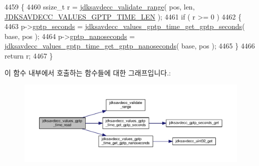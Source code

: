 \begin{DoxyCode}
4459 \{
4460     ssize\_t r = \hyperlink{group__util_ga9c02bdfe76c69163647c3196db7a73a1}{jdksavdecc\_validate\_range}( pos, len, 
      \hyperlink{group__values__gptp__time_ga78c1703ccda95c5b83f9cbcd68bcca08}{JDKSAVDECC\_VALUES\_GPTP\_TIME\_LEN} );
4461     \textcolor{keywordflow}{if} ( r >= 0 )
4462     \{
4463         p->\hyperlink{structjdksavdecc__values__gptp__time_a188b5eb829d9cabad72f2977aa72be85}{gptp\_seconds} = 
      \hyperlink{group__values__gptp__time_ga49bdb84c4dea31f69f583ed725152a22}{jdksavdecc\_values\_gptp\_time\_get\_gptp\_seconds}( base, pos );
4464         p->\hyperlink{structjdksavdecc__values__gptp__time_a5365958d411fe32d294129809036c617}{gptp\_nanoseconds} = 
      \hyperlink{group__values__gptp__time_ga125442481fda8ef931f1e6ae5b787839}{jdksavdecc\_values\_gptp\_time\_get\_gptp\_nanoseconds}( base, pos
       );
4465     \}
4466     \textcolor{keywordflow}{return} r;
4467 \}
\end{DoxyCode}


이 함수 내부에서 호출하는 함수들에 대한 그래프입니다.\+:
\nopagebreak
\begin{figure}[H]
\begin{center}
\leavevmode
\includegraphics[width=350pt]{group__values__gptp__time_gac150692574fc07f1339db553770ce0a4_cgraph}
\end{center}
\end{figure}


